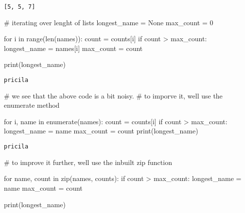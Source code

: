 \documentclass[
]{report}
\newenvironment{Shaded}{\begin{snugshade}}{\end{snugshade}}
\newcommand{\BuiltInTok}[1]{\textcolor[rgb]{0.00,0.23,0.31}{#1}}
\newcommand{\CommentTok}[1]{\textcolor[rgb]{0.37,0.37,0.37}{#1}}
\newcommand{\ControlFlowTok}[1]{\textcolor[rgb]{0.00,0.23,0.31}{#1}}
\newcommand{\DecValTok}[1]{\textcolor[rgb]{0.68,0.00,0.00}{#1}}
\newcommand{\KeywordTok}[1]{\textcolor[rgb]{0.00,0.23,0.31}{#1}}
\newcommand{\NormalTok}[1]{\textcolor[rgb]{0.00,0.23,0.31}{#1}}
\newcommand{\OperatorTok}[1]{\textcolor[rgb]{0.37,0.37,0.37}{#1}}
\newcommand{\VariableTok}[1]{\textcolor[rgb]{0.07,0.07,0.07}{#1}}
\begin{document}
\begin{verbatim}
[5, 5, 7]
\end{verbatim}

\begin{Shaded}
\begin{Highlighting}[]
\CommentTok{\# iterating over lenght of lists}
\NormalTok{longest\_name }\OperatorTok{=} \VariableTok{None}
\NormalTok{max\_count }\OperatorTok{=} \DecValTok{0}

\ControlFlowTok{for}\NormalTok{ i }\KeywordTok{in} \BuiltInTok{range}\NormalTok{(}\BuiltInTok{len}\NormalTok{(names)):}
\NormalTok{    count }\OperatorTok{=}\NormalTok{ counts[i]}
    \ControlFlowTok{if}\NormalTok{ count }\OperatorTok{\textgreater{}}\NormalTok{ max\_count:}
\NormalTok{        longest\_name }\OperatorTok{=}\NormalTok{ names[i]}
\NormalTok{        max\_count }\OperatorTok{=}\NormalTok{ count}
        
\BuiltInTok{print}\NormalTok{(longest\_name)}
\end{Highlighting}
\end{Shaded}

\begin{verbatim}
pricila
\end{verbatim}

\begin{Shaded}
\begin{Highlighting}[]
\CommentTok{\# we see that the above code is a bit noisy. }
\CommentTok{\# to imporve it, we\textquotesingle{}ll use the enumerate method}

\ControlFlowTok{for}\NormalTok{ i, name }\KeywordTok{in} \BuiltInTok{enumerate}\NormalTok{(names):}
\NormalTok{    count }\OperatorTok{=}\NormalTok{ counts[i]}
    \ControlFlowTok{if}\NormalTok{ count }\OperatorTok{\textgreater{}}\NormalTok{ max\_count:}
\NormalTok{        longest\_name }\OperatorTok{=}\NormalTok{ name}
\NormalTok{        max\_count }\OperatorTok{=}\NormalTok{ count}
\BuiltInTok{print}\NormalTok{(longest\_name)}
\end{Highlighting}
\end{Shaded}

\begin{verbatim}
pricila
\end{verbatim}

\begin{Shaded}
\begin{Highlighting}[]
\CommentTok{\# to improve it further, we\textquotesingle{}ll use the inbuilt zip function}

\ControlFlowTok{for}\NormalTok{ name, count }\KeywordTok{in} \BuiltInTok{zip}\NormalTok{(names, counts):}
    \ControlFlowTok{if}\NormalTok{ count }\OperatorTok{\textgreater{}}\NormalTok{ max\_count:}
\NormalTok{        longest\_name }\OperatorTok{=}\NormalTok{ name}
\NormalTok{        max\_count }\OperatorTok{=}\NormalTok{ count}

\BuiltInTok{print}\NormalTok{(longest\_name)}
\end{Highlighting}
\end{Shaded}
\end{document}
